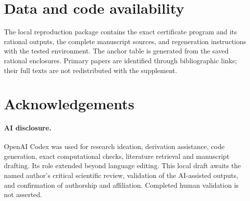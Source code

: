 \documentclass[11pt]{article}
\begin{document}
\section*{Data and code availability}
The local reproduction package contains the exact certificate
program and its rational outputs, the complete manuscript sources,
and regeneration instructions with the tested environment.
The anchor table is generated from the saved rational enclosures.
Primary papers are identified through bibliographic links; their
full texts are not redistributed with the supplement.

\section*{Acknowledgements}
\paragraph{AI disclosure.}
OpenAI Codex was used for research ideation, derivation assistance,
code generation, exact computational checks, literature retrieval
and manuscript drafting. Its role extended beyond language editing.
This local draft awaits the named author's critical scientific
review, validation of the AI-assisted outputs, and confirmation of
authorship and affiliation. Completed human validation is not asserted.



\end{document}
